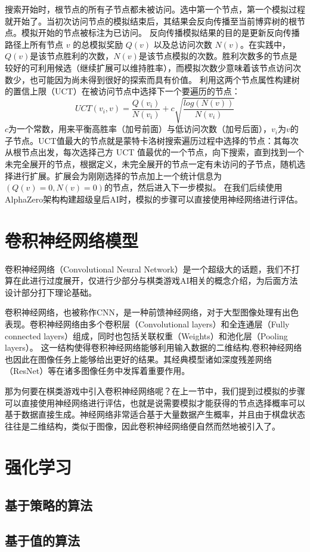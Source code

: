 搜索开始时，根节点的所有子节点都未被访问。选中第一个节点，第一个模拟过程就开始了。当初次访问节点的模拟结束后，其结果会反向传播至当前博弈树的根节点。模拟开始的节点被标注为已访问。
反向传播模拟结果的目的是更新反向传播路径上所有节点 $v$ 的总模拟奖励 $Q(v)$ 以及总访问次数 $N(v)$。在实践中，$Q(v)$是该节点胜利的次数，$N(v)$是该节点模拟的次数。胜利次数多的节点是较好的可利用候选（继续扩展可以维持胜率），而模拟次数少意味着该节点访问次数少，也可能因为尚未得到很好的探索而具有价值。
利用这两个节点属性构建树的置信上限（UCT）\cite{10.1007/11871842_29}在被访问节点中选择下一个要遍历的节点：
\begin{equation}
    UCT(v_{i},v) = \frac{Q(v_{i})}{N(v_{i})} + c\sqrt{\frac{log(N(v))}{N(v_{i})}}
\end{equation}
$c$为一个常数，用来平衡高胜率（加号前面）与低访问次数（加号后面），$v_{i}$为$v$的子节点。UCT值最大的节点就是蒙特卡洛树搜索遍历过程中选择的节点：其每次从根节点出发，每次选择己方 UCT 值最优的一个节点，向下搜索，直到找到一个未完全展开的节点，根据定义，未完全展开的节点一定有未访问的子节点，随机选择进行扩展。扩展会为刚刚选择的节点加上一个统计信息为$(Q(v)=0,N(v)=0)$的节点，然后进入下一步模拟。
在我们后续使用AlphaZero架构构建超级皇后AI时，模拟的步骤可以直接使用神经网络进行评估\cite{Silver1140,Silver2017,Silver2016}。

\section{卷积神经网络模型}
卷积神经网络（Convolutional Neural Network）是一个超级大的话题，我们不打算在此进行过度展开，仅进行少部分与棋类游戏AI相关的概念介绍，为后面方法设计部分打下理论基础。

卷积神经网络，也被称作CNN，是一种前馈神经网络\cite{SCHMIDHUBER201585}，对于大型图像处理有出色表现\cite{NIPS2012_4824}。卷积神经网络由多个卷积层（Convolutional layers）和全连通层（Fully connected layers）组成，同时也包括关联权重（Weights）和池化层（Pooling layers）\cite{venkatesan2017convolutional}。
这一结构使得卷积神经网络能够利用输入数据的二维结构,卷积神经网络也因此在图像任务上能够给出更好的结果\cite{VALUEVA2020232}。其经典模型诸如深度残差网络（ResNet）\cite{resnet}等在诸多图像任务中发挥着重要作用。

那为何要在棋类游戏中引入卷积神经网络呢？在上一节中，我们提到过模拟的步骤可以直接使用神经网络进行评估，也就是说需要模拟才能获得的节点选择概率可以基于数据直接生成。神经网络非常适合基于大量数据产生概率，并且由于棋盘状态往往是二维结构，类似于图像，因此卷积神经网络便自然而然地被引入了\cite{Silver1140,Silver2017,Silver2016}。

\section{强化学习}

\subsection{基于策略的算法}

\subsection{基于值的算法}